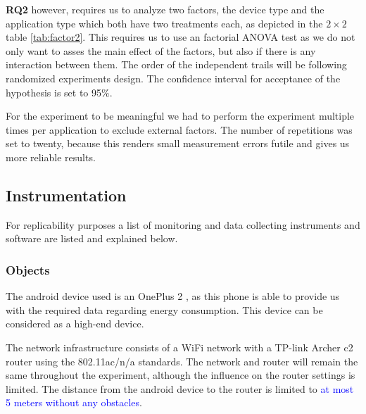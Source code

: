 \textbf{RQ2} however, requires us to analyze two factors, the device type and the application type which both have two treatments each, as depicted in the $2\times2$ table \autoref{tab:factor2}. This requires us to use an factorial ANOVA test as we do not only want to asses the main effect of the factors, but also if there is any interaction between them.
The order of the independent trails will be following randomized experiments design. The confidence interval for acceptance of the hypothesis is set to 95\%. 

For the experiment to be meaningful we had to perform the experiment multiple times per application to exclude external factors. The number of repetitions was set to twenty, because this renders small measurement errors futile and gives us more reliable results. 





\subsection{Instrumentation}

For replicability purposes a list of monitoring and data collecting instruments and software are listed and explained below.

\subsubsection*{Objects}
The android device used is an OnePlus 2 \cite{op2}, as this phone is able to provide us with the required data regarding energy consumption. This device can be considered as a high-end device. 

The network infrastructure consists of a WiFi network with a TP-link Archer c2 router \cite{ad7200} using the 802.11ac/n/a standards. The network and router will remain the same throughout the experiment, although the influence on the router settings is limited. The distance from the android device to the router is limited to \textcolor{blue}{at most 5 meters without any obstacles}.
